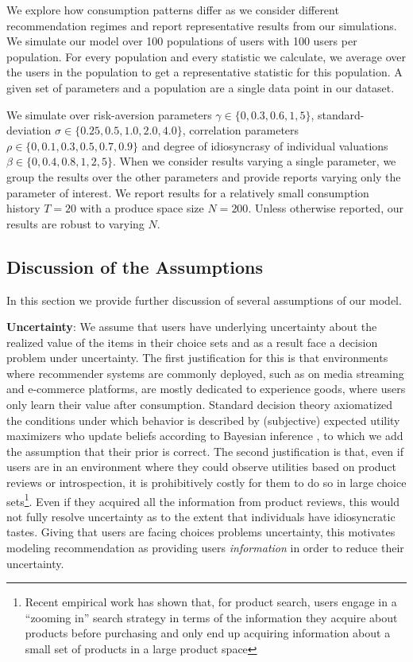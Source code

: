 \documentclass[sigconf, anonymous, review]{acmart}
\begin{document}
We explore how consumption patterns differ as we consider different recommendation regimes and report representative results from our simulations. We simulate our model over 100 populations of users with 100 users per population. For every population and every statistic we calculate, we average over the users in the population to get a representative statistic for this population. A given set of parameters and a population are a single data point in our dataset.
\par

We simulate over risk-aversion parameters $\gamma \in \{ 0, 0.3, 0.6, 1, 5 \}$, standard-deviation $\sigma \in \{ 0.25, 0.5, 1.0, 2.0, 4.0 \}$, correlation parameters $\rho\in \{ 0, 0.1, 0.3, 0.5, 0.7, 0.9 \} $ and degree of idiosyncrasy of individual valuations $\beta \in \{ 0, 0.4, 0.8, 1, 2, 5\}$. When we consider results varying a single parameter, we group the results over the other parameters and provide reports varying only the parameter of interest. We report results for a relatively small consumption history $T=20$ with a produce space size $N=200$. Unless otherwise reported, our results are robust to varying $N$.

\subsection{Discussion of the Assumptions}
In this section we provide further discussion of several assumptions of our model.
\par

\noindent \textbf{Uncertainty}: We assume that users have underlying uncertainty about the realized value of the items in their choice sets and as a result face a decision problem under uncertainty. The first justification for this is that environments where recommender systems are commonly deployed, such as on media streaming and e-commerce platforms, are mostly dedicated to experience goods, where users only learn their value after consumption. Standard decision theory axiomatized the conditions under which behavior is described by (subjective) expected utility maximizers \cite{savage1954} who update beliefs according to Bayesian inference \cite{ghirardato2002revisiting}, to which we add the assumption that their prior is correct. The second justification is that, even if users are in an environment where they could observe utilities based on product reviews or introspection, it is prohibitively costly for them to do so in large choice sets\footnote{Recent empirical work \cite{bronnenberg2014zooming,hodgson2019horse} has shown that, for product search, users engage in a ``zooming in'' search strategy in terms of the information they acquire about products before purchasing and only end up acquiring information about a small set of products in a large product space}.  Even if they acquired all the information from product reviews, this would not fully resolve uncertainty as to the extent that individuals have idiosyncratic tastes. Giving that users are facing choices problems uncertainty, this motivates modeling recommendation as providing users \textit{information} in order to reduce their uncertainty.
\par
\end{document}
